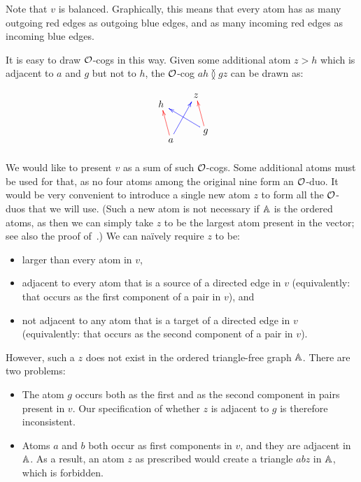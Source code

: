 Note that $v$ is balanced. 
Graphically, this means that every atom has as many outgoing red edges as outgoing blue edges, and as many incoming red edges as incoming blue edges.

It is easy to draw $\cal O$-cogs in this way. 
Given some additional atom $z>h$ which is adjacent to $a$ and $g$ but not to $h$, the $\cal O$-cog $ah\between gz$ can be drawn as:
\[\rotatebox{15}{
    \xymatrix{
    \rotatebox{-15}{$h$} & \rotatebox{-15}{$z$} \\
    \rotatebox{-15}{$a$}\ar@[red][u]\ar@[blue][ur] & \rotatebox{-15}{$g$}\ar@[blue][ul]\ar@[red][u]  
    }
}\]

We would like to present $v$ as a sum of such ${\cal O}$-cogs. 
Some additional atoms must be used for that, as no four atoms among the original nine form an $\cal O$-duo.
It would be very convenient to introduce a single new atom $z$ to form all the $\cal O$-duos that we will use. 
(Such a new atom is not necessary if $\A$ is the ordered atoms, as then we can simply take $z$ to be the largest atom present in the vector; 
see also the proof of~\cite[]{BFKM24}.)
We can naïvely require $z$ to be:
\begin{itemize}
    \item 
    larger than every atom in $v$,

    \item 
    adjacent to every atom that is a source of a directed edge in $v$ 
    (equivalently: that occurs as the first component of a pair in $v$), and
    
    \item 
    not adjacent to any atom that is a target of a directed edge in $v$ 
    (equivalently: that occurs as the second component of a pair in $v$).
\end{itemize}
However, such a $z$ does not exist in the ordered triangle-free graph $\A$. 
There are two problems:
\begin{itemize}
    \item 
    The atom $g$ occurs both as the first and as the second component in pairs present in $v$. 
    Our specification of whether $z$ is adjacent to $g$ is therefore inconsistent.
    
    \item 
    Atoms $a$ and $b$ both occur as first components in $v$, and they are adjacent in $\A$. 
    As a result, an atom $z$ as prescribed would create a triangle $abz$ in $\A$, which is forbidden.
\end{itemize}
